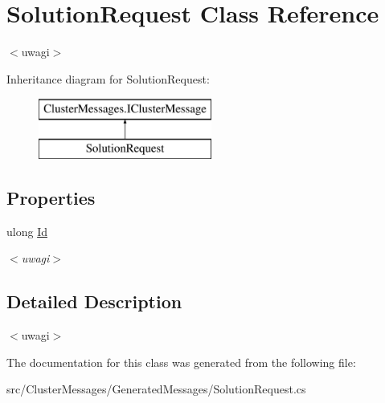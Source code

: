 \hypertarget{class_solution_request}{}\section{Solution\+Request Class Reference}
\label{class_solution_request}


$<$uwagi$>$  


Inheritance diagram for Solution\+Request\+:\begin{figure}[H]
\begin{center}
\leavevmode
\includegraphics[height=2.000000cm]{class_solution_request}
\end{center}
\end{figure}
\subsection*{Properties}
\begin{DoxyCompactItemize}
\item 
\hypertarget{class_solution_request_a6b1ab40c6b749f684455f79e43d073bf}{}ulong \hyperlink{class_solution_request_a6b1ab40c6b749f684455f79e43d073bf}{Id}\label{class_solution_request_a6b1ab40c6b749f684455f79e43d073bf}

\begin{DoxyCompactList}\small\item\em $<$uwagi$>$ \end{DoxyCompactList}\end{DoxyCompactItemize}


\subsection{Detailed Description}
$<$uwagi$>$ 

The documentation for this class was generated from the following file\+:\begin{DoxyCompactItemize}
\item 
src/\+Cluster\+Messages/\+Generated\+Messages/Solution\+Request.\+cs\end{DoxyCompactItemize}
